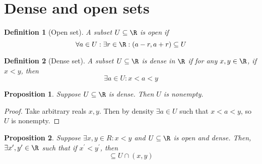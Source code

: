 \documentclass[letterpaper,11pt]{article}
\newtheorem{prop}{Proposition}
\newtheorem{defn}{Definition}
\newcommand{\intersn}{\cap}
\begin{document}
\section{Dense and open sets}

\begin{defn}[Open set]
  A subset $U \subseteq \R$ is \emph{open} if
  \begin{equation*}
    \forall a \in U: \exists r \in \R: (a - r, a + r) \subseteq U
  \end{equation*}
\end{defn}

\begin{defn}[Dense set]
  A subset $U \subseteq \R$ is \emph{dense} in $\R$ if for any $x, y \in \R$,
  if $x < y$, then
  \begin{equation*}
    \exists a \in U: x < a < y
  \end{equation*}
\end{defn}

\begin{prop}
  Suppose $U \subseteq \R$ is dense. Then $U$ is nonempty.
\end{prop}

\begin{proof}
  Take arbitrary reals $x, y$. Then by density $\exists a \in U$ such that
  $x < a < y$, so $U$ is nonempty.
\end{proof}

\begin{prop}
  Suppose $\exists x, y \in R: x < y$ and $U \subseteq \R$ is open and dense.
  Then, $\exists x^\prime, y^\prime \in \R$ such that if $x^\prime < y^\prime$,
  then
  \begin{equation*}
    [x^\prime, y^\prime] \subseteq U \intersn (x, y)
  \end{equation*}
\end{prop}
\end{document}
